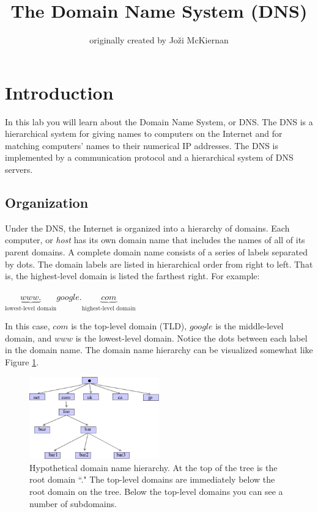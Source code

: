 \documentclass[11pt,a4paper]{article}
\title{The Domain Name System (DNS) \vspace{-2ex}}
\author{originally created by Jo\v{z}i McKiernan}
\date{}
\begin{document}
\maketitle



\section{Introduction}

\indent\indent In this lab you will learn about the Domain Name System, or DNS.
The DNS is a hierarchical system for giving names to computers on the Internet and for matching computers' names to their numerical IP addresses. 
The DNS is implemented by a communication protocol and a hierarchical system of DNS servers.


\subsection{Organization}
\indent\indent Under the DNS, the Internet is organized into a hierarchy of domains. 
Each computer, or \textit{host} has its own domain name that includes the names of all of its parent domains.
A complete domain name consists of a series of labels separated by dots. 
The domain labels are listed in hierarchical order from right to left.
That is, the highest-level domain is listed the farthest right. 
For example:

\begin{center}
$\underbrace{www.}_{\text{lowest-level domain}}google.\underbrace{com}_{\text{highest-level domain}}$



\end{center}
In this case, $com$ is the top-level domain (TLD), $google$ is the middle-level domain, and $www$ is the lowest-level domain. 
Notice the dots between each label in the domain name.
The domain name hierarchy can be visualized somewhat like Figure \ref{fig:hierarchy}.

\begin{figure}[H]
	
    \centering
    	\includegraphics[width=0.5\textwidth]{dns.jpg}
    \caption{Hypothetical domain name hierarchy. At the top of the tree is the root domain ``." The top-level domains are immediately below the root domain on the tree. Below the top-level domains you can see a number of subdomains.}
    \label{fig:hierarchy}
\end{figure}
\end{document}
